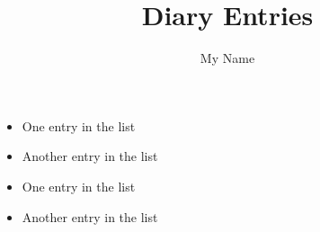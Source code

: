 \documentclass{article}
\title{Diary Entries}
\author{My Name}
\begin{document}
	\maketitle
	
	\begin{itemize}
		\item One entry in the list
		\item Another entry in the list
	\end{itemize}
	\begin{itemize}
		\item One entry in the list
		\item Another entry in the list
	\end{itemize}
\end{document}
